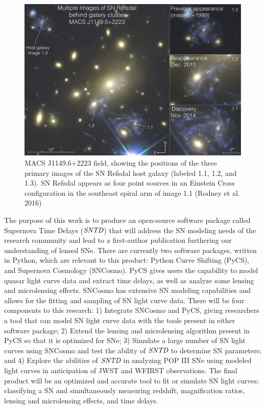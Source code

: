 \begin{figure}[h]
\centering
\includegraphics[scale=.15]{refsdal_rodney.pdf}
\caption{MACS J1149.6+2223 field, showing the positions of the three primary images of the SN Refsdal host galaxy (labeled 1.1, 1.2, and 1.3). SN Refsdal appears as four point sources in an Einstein Cross configuration in the southeast spiral arm of image 1.1 (Rodney et al. 2016)}
\end{figure}


The purpose of this work is to produce an open-source software package called Supernova Time Delays ($\textit{SNTD}$) that will address the SN modeling needs of the research community and lead to a first-author publication furthering our understanding of lensed SNe. There are currently two software packages, written in Python, which are relevant to this product: Python Curve Shifting (PyCS), and Supernova Cosmology (SNCosmo). PyCS gives users the capability to model quasar light curve data and extract time delays, as well as analyze some lensing and microlensing effects. SNCosmo has extensive SN modeling capabilities and allows for the fitting and sampling of SN light curve data. There will be four components to this research: 1) Integrate SNCosmo and PyCS, giving researchers a tool that can model SN light curve data with the tools present in either software package; 2) Extend the lensing and microlensing algorithm present in PyCS so that it is optimized for SNe; 3) Simulate a large number of SN light curves using SNCosmo and test the ability of $\textit{SNTD}$ to determine SN parameters; and 4) Explore the abilities of $\textit{SNTD}$ in analyzing POP III SNe using modeled light curves in anticipation of JWST and WFIRST observations. The final product will be an optimized and accurate tool to fit or simulate SN light curves; classifying a SN and simultaneously measuring redshift, magnification ratios, lensing and microlensing effects, and time delays.



